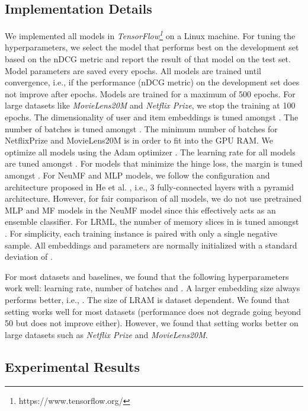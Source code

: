 \documentclass[sigconf]{acmart}
\begin{document}
\subsection{Implementation Details}
We implemented all models in \textit{TensorFlow\footnote{https://www.tensorflow.org/}} on a Linux machine. For tuning the hyperparameters, we select the model that performs best on the development set based on the nDCG metric and report the result of that model on the test set. Model parameters are saved every  epochs. All models are trained until convergence, i.e., if the performance (nDCG metric) on the development set does not improve after  epochs. Models are trained for a maximum of 500 epochs. For large datasets like \textit{MovieLens20M} and \textit{Netflix Prize}, we stop the training at 100 epochs. The dimensionality of user and item embeddings  is tuned amongst . The number of batches  is tuned amongst . The minimum number of batches for NetflixPrize and MovieLens20M is  in order to fit into the GPU RAM. We optimize all models using the Adam optimizer \cite{DBLP:journals/corr/KingmaB14}. The learning rate for all models are tuned amongst . For models that minimize the hinge loss, the margin  is tuned amongst . For NeuMF and MLP models, we follow the configuration and architecture proposed in He et al. \cite{He:2017:NCF:3038912.3052569}, i.e., 3 fully-connected layers with a pyramid architecture. However, for fair comparison of all models, we do not use pretrained MLP and MF models in the NeuMF model since this effectively acts as an ensemble classifier. For \textsc{LRML}, the number of memory slices in  is tuned amongst . For simplicity, each training instance is paired with only a single negative sample. All embeddings and parameters are normally initialized with a standard deviation of .

For most datasets and baselines, we found that the following hyperparameters work well: learning rate, number of batches  and . A larger embedding size always performs better, i.e., . The size of LRAM is dataset dependent. We found that setting  works well for most datasets (performance does not degrade going beyond 50 but does not improve either). However, we found that setting  works better on large datasets such as \textit{Netflix Prize} and \textit{MovieLens20M}.  

\subsection{Experimental Results}
\end{document}
